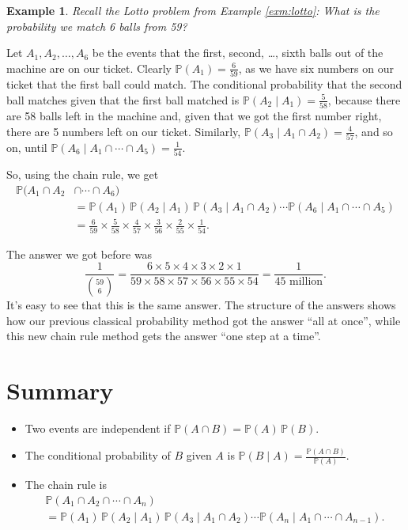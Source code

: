 \documentclass[
  a4paper,
]{book}
\providecommand{\tightlist}{%
  \setlength{\itemsep}{0pt}\setlength{\parskip}{0pt}}
\theoremstyle{definition}
\theoremstyle{definition}
\newtheorem{example}{Example}[chapter]
\theoremstyle{definition}
\theoremstyle{definition}
\theoremstyle{remark}
\begin{document}
\begin{example}
\emph{Recall the Lotto problem from Example \ref{exm:lotto}: What is the probability we match 6 balls from 59?}

Let \(A_1, A_2, \dots, A_6\) be the events that the first, second, \ldots, sixth balls out of the machine are on our ticket. Clearly \(\mathbb P(A_1) = \frac{6}{59}\), as we have six numbers on our ticket that the first ball could match. The conditional probability that the second ball matches given that the first ball matched is \(\mathbb P(A_2 \mid A_1) = \frac{5}{58}\), because there are 58 balls left in the machine and, given that we got the first number right, there are 5 numbers left on our ticket. Similarly, \(\mathbb P(A_3 \mid A_1 \cap A_2) = \frac{4}{57}\), and so on, until \(\mathbb P(A_6 \mid A_1 \cap \cdots\cap A_5) = \frac{1}{54}\).

So, using the chain rule, we get
\begin{align*}
\mathbb P(A_1 \cap A_2 &\cap \cdots \cap A_6) \\
&= \mathbb P(A_1) \, \mathbb P(A_2 \mid A_1) \, \mathbb P(A_3 \mid A_1 \cap A_2) \cdots \mathbb P(A_6 \mid A_1 \cap \cdots \cap A_5) \\
&= \frac{6}{59} \times \frac{5}{58} \times \frac{4}{57} \times \frac{3}{56} \times \frac{2}{55} \times \frac{1}{54} .
\end{align*}

The answer we got before was
\[ \frac{1}{\binom{59}{6}} = \frac{6 \times 5 \times 4 \times 3 \times 2 \times 1}{59 \times 58 \times 57 \times 56 \times 55 \times 54} = \frac{1}{45 \text{ million}} . \]
It's easy to see that this is the same answer. The structure of the answers shows how our previous classical probability method got the answer ``all at once'', while this new chain rule method gets the answer ``one step at a time''.
\end{example}

\hypertarget{summary-L07}{%
\section*{Summary}\label{summary-L07}}

\begin{itemize}
\tightlist
\item
  Two events are independent if \(\mathbb P(A \cap B) = \mathbb P(A)\, \mathbb P(B)\).
\item
  The conditional probability of \(B\) given \(A\) is \({\displaystyle \mathbb P(B \mid A) = \frac{\mathbb P(A \cap B)}{\mathbb P(A)}}\).
\item
  The chain rule is
  \begin{multline*}
  \mathbb P(A_1 \cap A_2 \cap \cdots \cap A_n) \\
  = \mathbb P(A_1) \, \mathbb P(A_2 \mid A_1) \, \mathbb P(A_3 \mid A_1 \cap A_2) \cdots \mathbb P(A_n \mid A_1 \cap \cdots \cap  A_{n-1}) . 
  \end{multline*}
\end{itemize}
\end{document}
